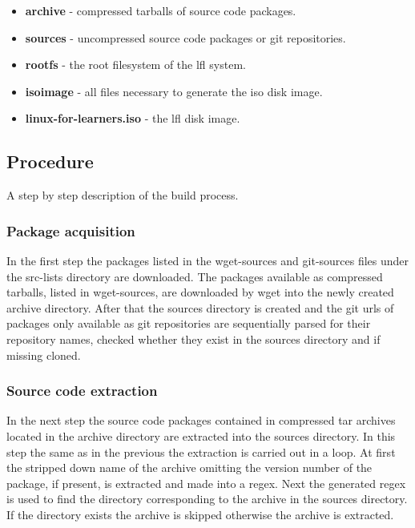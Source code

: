\begin{itemize}
    \item \textbf{archive} - compressed tarballs of source code packages.
    \item \textbf{sources} - uncompressed source code packages or git repositories.
    \item \textbf{rootfs} - the root filesystem of the \gls{lfl} system.
    \item \textbf{isoimage} - all files necessary to generate the \gls{iso} disk image.
    \item \textbf{linux-for-learners.iso} - the \gls{lfl} disk image.
\end{itemize}

\subsection{Procedure}

A step by step description of the build process.

\subsubsection{Package acquisition}

In the first step the packages listed in the wget-sources and git-sources files under the src-lists directory are downloaded. The packages available as compressed tarballs, listed in wget-sources, are downloaded by wget into the newly created archive directory. After that the sources directory is created and the git \glspl{url} of packages only available as git repositories are sequentially parsed for their repository names, checked whether they exist in the sources directory and if missing cloned.


\subsubsection{Source code extraction}

In the next step the source code packages contained in compressed tar archives located in the archive directory are extracted into the sources directory. In this step the same as in the previous the extraction is carried out in a loop. At first the stripped down name of the archive omitting the version number of the package, if present, is extracted and made into a \gls{regex}. Next the generated \gls{regex} is used to find the directory corresponding to the archive in the sources directory. If the directory exists the archive is skipped otherwise the archive is extracted.

